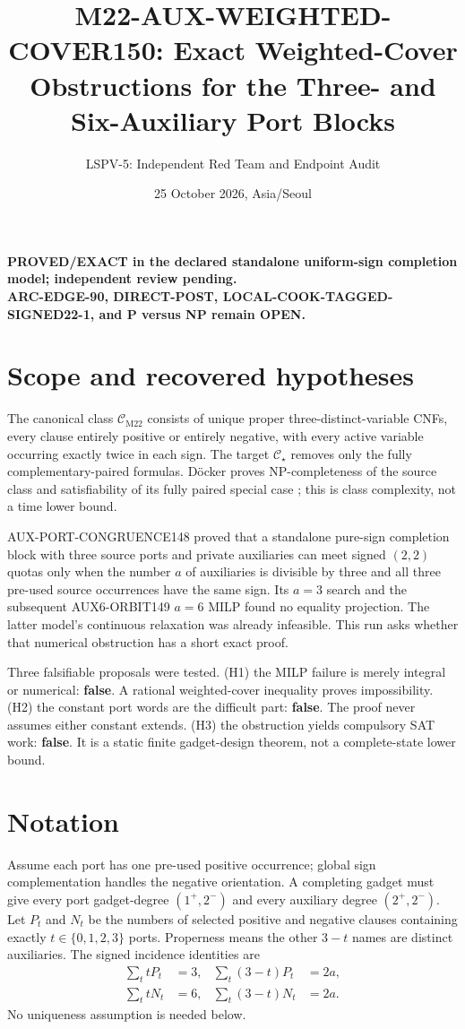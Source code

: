 \documentclass[11pt]{article}
\title{M22-AUX-WEIGHTED-COVER150: Exact Weighted-Cover Obstructions for the Three- and Six-Auxiliary Port Blocks}
\author{LSPV-5: Independent Red Team and Endpoint Audit}
\date{25 October 2026, Asia/Seoul}
\newcommand{\CM}{\mathcal C_{\mathrm{M22}}}
\newcommand{\CS}{\mathcal C_\star}
\begin{document}
\maketitle

\begin{center}
\textbf{PROVED/EXACT in the declared standalone uniform-sign completion model; independent review pending.}\\
\textbf{ARC-EDGE-90, DIRECT-POST, LOCAL-COOK-TAGGED-SIGNED22-1, and P versus NP remain OPEN.}
\end{center}

\section{Scope and recovered hypotheses}
The canonical class $\CM$ consists of unique proper three-distinct-variable CNFs, every clause entirely positive or entirely negative, with every active variable occurring exactly twice in each sign.  The target $\CS$ removes only the fully complementary-paired formulas.  D\"ocker proves NP-completeness of the source class and satisfiability of its fully paired special case \cite{docker}; this is class complexity, not a time lower bound.

AUX-PORT-CONGRUENCE148 proved that a standalone pure-sign completion block with three source ports and private auxiliaries can meet signed $(2,2)$ quotas only when the number $a$ of auxiliaries is divisible by three and all three pre-used source occurrences have the same sign.  Its $a=3$ search and the subsequent AUX6-ORBIT149 $a=6$ MILP found no equality projection.  The latter model's continuous relaxation was already infeasible.  This run asks whether that numerical obstruction has a short exact proof.

Three falsifiable proposals were tested.  (H1) the MILP failure is merely integral or numerical: \textbf{false}.  A rational weighted-cover inequality proves impossibility.  (H2) the constant port words are the difficult part: \textbf{false}.  The proof never assumes either constant extends.  (H3) the obstruction yields compulsory SAT work: \textbf{false}.  It is a static finite gadget-design theorem, not a complete-state lower bound.

\section{Notation}
Assume each port has one pre-used positive occurrence; global sign complementation handles the negative orientation.  A completing gadget must give every port gadget-degree $(1^+,2^-)$ and every auxiliary degree $(2^+,2^-)$.  Let $P_t$ and $N_t$ be the numbers of selected positive and negative clauses containing exactly $t\in\{0,1,2,3\}$ ports.  Properness means the other $3-t$ names are distinct auxiliaries.  The signed incidence identities are
\begin{align}
 \sum_t tP_t&=3,& \sum_t(3-t)P_t&=2a,\\
 \sum_t tN_t&=6,& \sum_t(3-t)N_t&=2a.\label{eq:degrees}
\end{align}
No uniqueness assumption is needed below.
\end{document}
